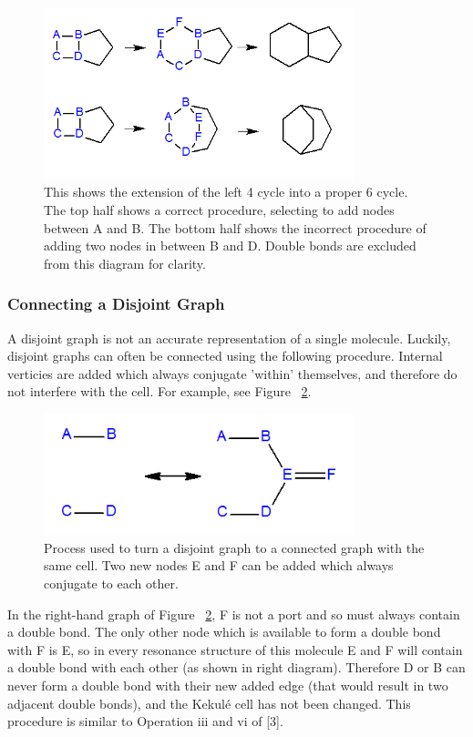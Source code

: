 \documentclass[12pt]{article}
\begin{document}
\begin{figure}[ht!]
\centering
\includegraphics[width=90mm]{cycleExtension.png}
\caption{This shows the extension of the left 4 cycle into a proper 6 cycle. The top half shows a correct procedure, selecting to add nodes between A and B. The bottom half shows the incorrect procedure of adding two nodes in between B and D. Double bonds are excluded from this diagram for clarity.}
\label{fig:cycleExtension}
\end{figure}

\subsubsection{Connecting a Disjoint Graph}
A disjoint graph is not an accurate representation of a single molecule. Luckily, disjoint graphs can often be connected using the following procedure. Internal verticies are added which always conjugate ’within’ themselves, and therefore do not interfere with the cell. For example, see Figure ~\ref{fig:disjoint}.

\begin{figure}[ht!]
\centering
\includegraphics[width=90mm]{disjoint2.png}
\caption{Process used to turn a disjoint graph to a connected graph with the same cell. Two new nodes E and F can be added which always conjugate to each other.}
\label{fig:disjoint}
\end{figure}

In the right-hand graph of Figure ~\ref{fig:disjoint}, F is not a port and so must always contain a double bond. The only other node which is available to form a double bond with F is E, so in every resonance structure of this molecule E and F will contain a double bond with each other (as shown in right diagram). Therefore D or B can never form a double bond with their new added edge (that would result in two adjacent double bonds), and the Kekul\'e cell has not been changed. This procedure is similar to Operation iii and vi of [3].
\end{document}
